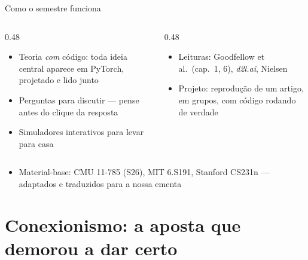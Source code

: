 \documentclass[aspectratio=169, 11pt]{beamer}
\begin{document}
\begin{frame}{Como o semestre funciona}
  \begin{columns}[T]
    \begin{column}{0.48\textwidth}
      \begin{tcolorbox}[iccaixa=icCiano, title={Em aula}]
        \begin{itemize}\setlength{\itemsep}{0.2ex}
          \item Teoria \emph{com} código: toda ideia central aparece em
                PyTorch, projetado e lido junto
          \item Perguntas para discutir — pense antes do clique da resposta
          \item Simuladores interativos para levar para casa
        \end{itemize}
      \end{tcolorbox}
    \end{column}
    \begin{column}{0.48\textwidth}
      \begin{tcolorbox}[iccaixa=icMagenta, title={Fora de aula}]
        \begin{itemize}\setlength{\itemsep}{0.2ex}
          \item Leituras: Goodfellow et al.\ (cap.\ 1, 6), \emph{d2l.ai},
                Nielsen
          \item Projeto: reprodução de um artigo, em grupos, com código
                rodando de verdade
        \end{itemize}
      \end{tcolorbox}
    \end{column}
  \end{columns}

  \medskip
  \begin{itemize}
    \item Material-base: CMU 11-785 (S26), MIT 6.S191, Stanford CS231n —
          adaptados e traduzidos para a nossa ementa
  \end{itemize}
\end{frame}

\section{Conexionismo: a aposta que demorou a dar certo}
\end{document}
